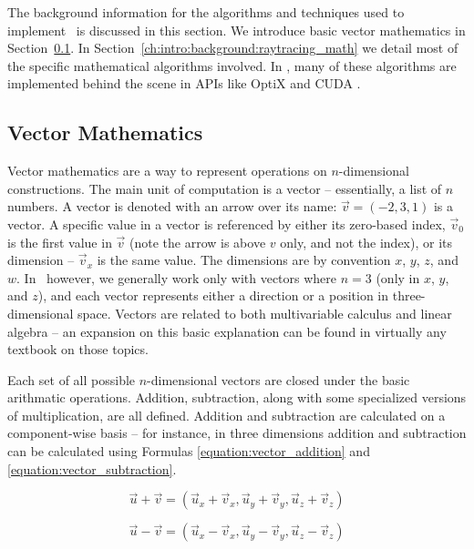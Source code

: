The background information for the algorithms and techniques used to implement \name\ is discussed in this section.
We introduce basic vector mathematics in Section~\ref{ch:intro:background:vector_math}.
In Section~\ref{ch:intro:background:raytracing_math} we detail most of the specific mathematical algorithms involved.
In \name, many of these algorithms are implemented behind the scene in APIs like OptiX and CUDA .

\subsection{Vector Mathematics}
\label{ch:intro:background:vector_math}

Vector mathematics are a way to represent operations on $n$-dimensional constructions.
The main unit of computation is a vector -- essentially, a list of $n$ numbers.
A vector is denoted with an arrow over its name: $\vec{v} = (-2, 3, 1)$ is a vector.
A specific value in a vector is referenced by either its zero-based index, $\vec{v}_{0}$ is the first value in $\vec{v}$ (note the arrow is above $v$ only, and not the index), or its dimension -- $\vec{v}_x$ is the same value.
The dimensions are by convention $x$, $y$, $z$, and $w$.
In \name\ however, we generally work only with vectors where $n = 3$ (only in $x$, $y$, and $z$), and each vector represents either a direction or a position in three-dimensional space.
Vectors are related to both multivariable calculus and linear algebra -- an expansion on this basic explanation can be found in virtually any textbook on those topics.

Each set of all possible $n$-dimensional vectors are closed under the basic arithmatic operations.
Addition, subtraction, along with some specialized versions of multiplication, are all defined.
Addition and subtraction are calculated on a component-wise basis -- for instance, in three dimensions addition and subtraction can be calculated using Formulas \ref{equation:vector_addition} and \ref{equation:vector_subtraction}.

\begin{equation}
  \label{equation:vector_addition}
  \vec{u} + \vec{v} = (\vec{u}_x + \vec{v}_x, \vec{u}_y + \vec{v}_y, \vec{u}_z + \vec{v}_z)
\end{equation}

\begin{equation}
  \label{equation:vector_subtraction}
  \vec{u} - \vec{v} = (\vec{u}_x - \vec{v}_x, \vec{u}_y - \vec{v}_y, \vec{u}_z - \vec{v}_z)
\end{equation}

